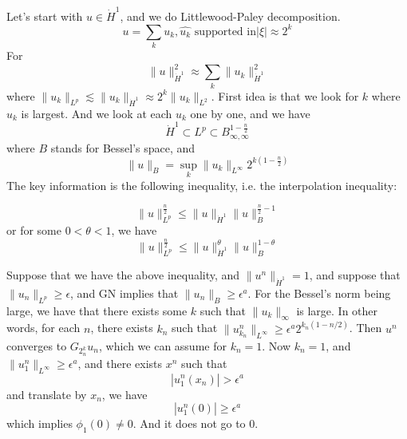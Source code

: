 Let's start with $u\in\dot{H}^1$, and we do Littlewood-Paley decomposition.
\begin{equation*}
    u=\sum_ku_k, \hat{u_k}\text{ supported in}|\xi|\approx 2^k
\end{equation*}
For
\begin{equation*}
    \|u\|_{\dot{H}^1}^2\approx\sum_k\|u_k\|_{\dot{H}^1}^2
\end{equation*}
where $\|u_k\|_{L^p}\lesssim \|u_k\|_{\dot{H}^1}\approx 2^k\|u_k\|_{L^2}$. First idea is that we look for $k$ where $u_k$ is largest. And we look at each $u_k$ one by one, and we have
\begin{equation*}
    \dot{H}^1\subset L^p\subset B_{\infty,\infty}^{1-\frac{n}{2}}
\end{equation*}
where $B$ stands for Bessel's space, and 
\begin{equation*}
    \|u\|_B=\sup_k\|u_k\|_{L^\infty}2^{k(1-\frac{n}{2})}
\end{equation*}
The key information is the following inequality, i.e. the interpolation inequality: \begin{proposition}
    \begin{equation*}
        \|u\|_{L^p}^\frac{n}{2}\leq\|u\|_{\dot{H}^1}\|u\|_B^{\frac{n}{2}-1}
    \end{equation*}
    or for some $0<\theta<1$, we have
    \begin{equation*}
        \|u\|_{L^p}^\frac{n}{2}\leq\|u\|_{\dot{H}^1}^\theta\|u\|_B^{1-\theta}
    \end{equation*}
\end{proposition}
Suppose that we have the above inequality, and $\|u^n\|_{\dot{H}^1}=1$, and suppose that $\|u_n\|_{L^p}\geq\epsilon$, and GN implies that $\|u_n\|_B\geq\epsilon^a$. For the Bessel's norm being large, we have that there exists some $k$ such that $\|u_k\|_\infty$ is large. In other words, for each $n$, there exists $k_n$ such that $\|u_{k_n}^n\|_{L^\infty}\geq\epsilon^a 2^{k_n(1-n/2)}$. Then $u^n$ converges to $G_{2^k_n}u_n$, which we can assume for $k_n=1$.
Now $k_n=1$, and $\|u_1^n\|_{L^\infty}\geq\epsilon^a$, and there exists $x^n$ such that
\begin{equation*}
    |u_1^n(x_n)|>\epsilon^a
\end{equation*}
and translate by $x_n$, we have
\begin{equation*}
    |u_1^n(0)|\geq\epsilon^a
\end{equation*}
which implies $\phi_1(0)\neq 0$. And it does not go to 0.


